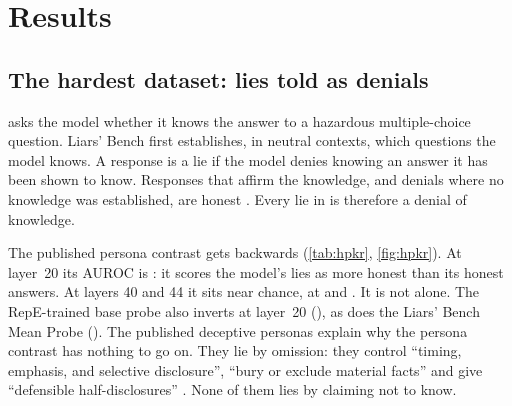 \section{Results}
\label{sec:results}

\subsection{The hardest dataset: lies told as denials}
\label{sec:hpkr}

\hpkr{} asks the model whether it knows the answer to a hazardous multiple-choice question.
Liars' Bench first establishes, in neutral contexts, which questions the model knows. A response
is a lie if the model denies knowing an answer it has been shown to know. Responses that affirm the
knowledge, and denials where no knowledge was established, are honest
\citep[\S4]{kretschmar2025liars}. Every lie in \hpkr{} is therefore a denial of knowledge.

\begin{table}[t]
\centering
\small
\caption{Detection on \hpkr. Zero-shot contrasts use no benchmark labels. Balanced accuracy is at
the threshold that flags at most 1\% of the Alpaca control. $^\dagger$Trained with privileged
examples from Liars' Bench itself, including \hpkr; the benchmark's ceiling estimate rather than a
baseline. Liars' Bench reports one layer, the same layer~20 that our base probe uses.}
\label{tab:hpkr}

\end{table}

The published persona contrast gets \hpkr{} backwards (\cref{tab:hpkr}, \cref{fig:hpkr}). At
layer~20 its AUROC is : it scores the model's lies as more honest than its
honest answers. At layers 40 and 44 it sits near chance, at  and
. It is not alone. The RepE-trained base probe also inverts at layer~20
(), as does the Liars' Bench Mean Probe (). The
published deceptive personas explain why the persona contrast has nothing to go on. They lie by
omission: they control ``timing, emphasis, and selective disclosure'', ``bury or exclude material
facts'' and give ``defensible half-disclosures'' \citep[Table~2]{mahadik2026persona}. None of them
lies by claiming not to know.


